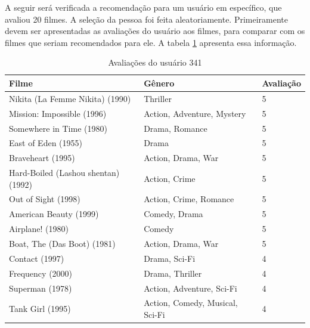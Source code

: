 \documentclass[12pt,a4paper,header]{abnt}
\begin{document}
A seguir será verificada a recomendação para um usuário em específico, que avaliou 20 filmes. A seleção da pessoa foi feita aleatoriamente. Primeiramente devem ser apresentadas as avaliações do usuário aos filmes, para comparar com os filmes que seriam recomendados para ele. A tabela \ref{user_rating} apresenta essa informação.

\begin{longtable}{@{}lll@{}}
\caption{Avaliações do usuário 341}
\label{user_rating}\\
\toprule
\textbf{Filme}                      & \textbf{Gênero}               & \textbf{Avaliação} \\* \midrule
\endhead
%
\bottomrule
\endfoot
%
\endlastfoot
%
Nikita (La Femme Nikita) (1990)     & Thriller                      & 5                  \\
Mission: Impossible (1996)          & Action, Adventure, Mystery      & 5                  \\
Somewhere in Time (1980)            & Drama, Romance                 & 5                  \\
East of Eden (1955)                 & Drama                         & 5                  \\
Braveheart (1995)                   & Action, Drama, War              & 5                  \\
Hard-Boiled (Lashou shentan) (1992) & Action, Crime                  & 5                  \\
Out of Sight (1998)                 & Action, Crime, Romance          & 5                  \\
American Beauty (1999)              & Comedy, Drama                  & 5                  \\
Airplane! (1980)                    & Comedy                        & 5                  \\
Boat, The (Das Boot) (1981)         & Action, Drama, War              & 5                  \\
Contact (1997)                      & Drama, Sci-Fi                  & 4                  \\
Frequency (2000)                    & Drama, Thriller                & 4                  \\
Superman (1978)                     & Action, Adventure, Sci-Fi       & 4                  \\
Tank Girl (1995)                    & Action, Comedy, Musical, Sci-Fi  & 4                  \\

\end{longtable}
\end{document}
